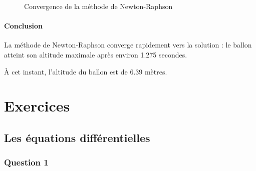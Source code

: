 \documentclass[
  12pt,
  letterpaper,
]{book}
\theoremstyle{remark}
\begin{document}
\begin{figure}[H]


\caption{\label{fig-convergence}Convergence de la méthode de
Newton-Raphson}

\end{figure}%

\subsection{Conclusion}\label{conclusion}

La méthode de Newton-Raphson converge rapidement vers la solution : le
ballon atteint son altitude maximale après environ 1.275 secondes.

À cet instant, l'altitude du ballon est de 6.39 mètres.

\part{Exercices}

\chapter{Les équations
différentielles}\label{les-uxe9quations-diffuxe9rentielles}

\section{Question 1}\label{question-1}
\end{document}
